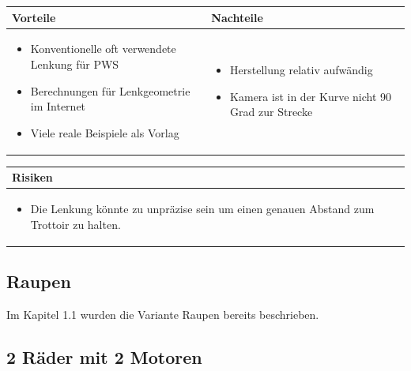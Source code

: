 \begin{table}[h]
\begin{tabular}{p{} | p{}}


 \textbf{Vorteile} & \textbf{Nachteile} \\ \hline
	 
\begin{itemize}
\item Konventionelle oft verwendete Lenkung für PWS
\item Berechnungen für Lenkgeometrie im Internet
\item Viele reale Beispiele als Vorlag
\end{itemize}

 
 &
 
\begin{itemize}
\item Herstellung relativ aufwändig
\item Kamera ist in der Kurve nicht 90 Grad zur Strecke
\end{itemize}

\end{tabular}
\end{table}

\begin{table}[h]
\begin{tabular}{p{}p{}}


 \textbf{Risiken} & \\ \hline
	 
\begin{itemize}
\item Die Lenkung könnte zu unpräzise sein um einen genauen Abstand zum Trottoir zu halten.
\end{itemize}


 
\end{tabular}
\end{table}

\pagebreak


\subsection{Raupen}
Im Kapitel 1.1 wurden die Variante Raupen bereits beschrieben.


\subsection{2 Räder mit 2 Motoren}

